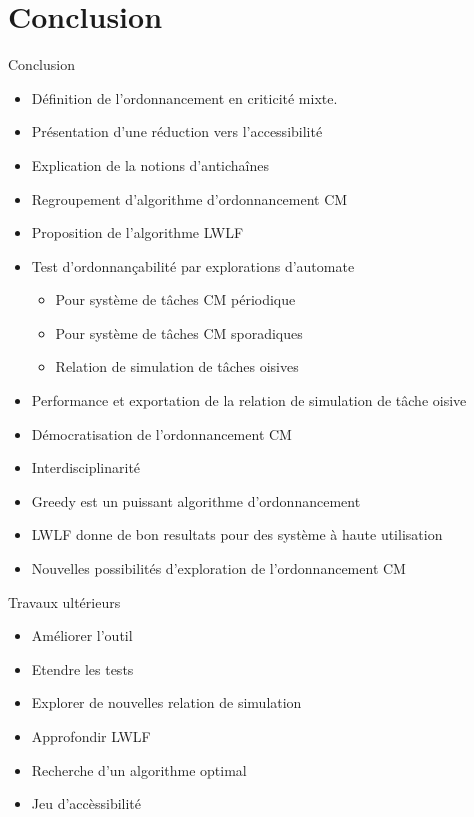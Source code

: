 \documentclass{bredelebeamer}
\begin{document}
\section{Conclusion}


\begin{frame}{Conclusion}

\begin{itemize}
\item Définition de l'ordonnancement en criticité mixte.
\item Présentation d'une réduction vers l'accessibilité
\item Explication de la notions d'antichaînes
\item Regroupement d'algorithme d'ordonnancement CM
\item Proposition de l'algorithme LWLF
\item Test d'ordonnançabilité par explorations d'automate \begin{itemize}
\item Pour système de tâches CM périodique
\item Pour système de tâches CM sporadiques
\item Relation de simulation de tâches oisives
\end{itemize}
\end{itemize}

\begin{itemize}
\item Performance et exportation de la relation de simulation de tâche oisive
\item Démocratisation de l'ordonnancement CM
\item Interdisciplinarité
\item Greedy est un puissant algorithme d'ordonnancement
\item LWLF donne de bon resultats pour des système à haute utilisation
\item Nouvelles possibilités d'exploration de l'ordonnancement CM
\end{itemize}

\end{frame}


\begin{frame}{Travaux ultérieurs}


\begin{itemize}
\item Améliorer l'outil
\item Etendre les tests
\item Explorer de nouvelles relation de simulation
\item Approfondir LWLF
\item Recherche d'un algorithme optimal
\item Jeu d'accèssibilité
\end{itemize}
\end{frame}
\end{document}
